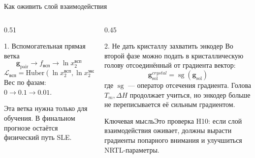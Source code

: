\documentclass[aspectratio=169,10pt]{beamer}
\newcommand{\smallnote}[1]{{\scriptsize\color{TGSlate}#1}}
\newcommand{\keybox}[1]{\begin{block}{Ключевая мысль}#1\end{block}}
\begin{document}
\begin{frame}{Как оживить слой взаимодействия}
  \small
  \begin{columns}[T,onlytextwidth]
    \begin{column}{0.51\textwidth}
      \begin{block}{1. Вспомогательная прямая ветка}
        \scriptsize
        \[
          \mathbf g_{\mathrm{pair}}
          \to f_{\mathrm{всп}}
          \to \ln x_2^{\mathrm{всп}}
        \]
        \[
          \mathcal L_{\mathrm{всп}}
          =
          \mathrm{Huber}(\ln x_2^{\mathrm{всп}}, \ln x_2^{\mathrm{эксп}})
        \]
        Вес по фазам: $0 \to 0.1 \to 0.01$.
      \end{block}
      \smallnote{Эта ветка нужна только для обучения. В финальном прогнозе остаётся физический путь SLE.}
    \end{column}
    \begin{column}{0.45\textwidth}
      \begin{block}{2. Не дать кристаллу захватить энкодер}
        \scriptsize
        Во второй фазе можно подать в кристаллическую голову
        отсоединённый от градиента вектор:
        \[
          \mathbf g_{\mathrm{sol}}^{crystal}
          =
          \operatorname{sg}(\mathbf g_{\mathrm{sol}})
        \]
        где $\operatorname{sg}$ — оператор отсечения градиента.
        Голова $T_m,\Delta H$ продолжает учиться, но энкодер
        больше не переписывается её сильным градиентом.
      \end{block}
      \keybox{\scriptsize Это проверка H10: если слой взаимодействия оживает,
      должны вырасти градиенты попарного внимания и улучшиться NRTL-параметры.}
    \end{column}
  \end{columns}
\end{frame}
\end{document}
